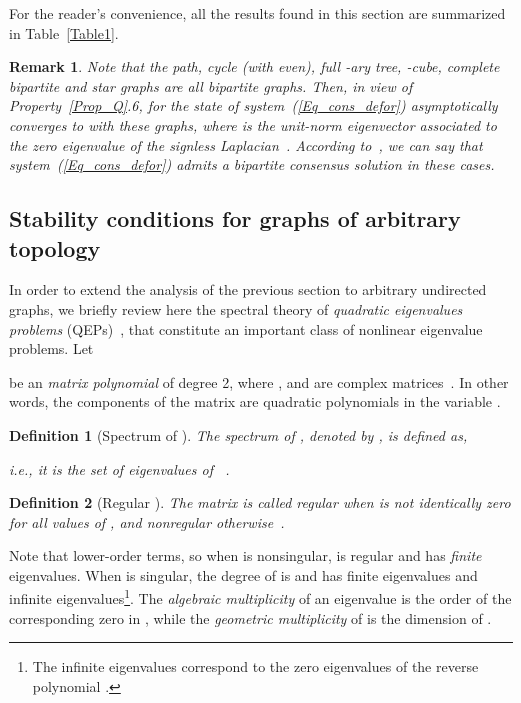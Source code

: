 \documentclass[letterpaper,9pt,twocolumn]{autart}
\newtheorem{definition}{\textbf{Definition}}
\newtheorem{remark}{\textbf{Remark}}
\begin{document}
For the reader's convenience, all the results found in this section are summarized in Table~\ref{Table1}.

\begin{remark}\label{Remark_bipart}
Note that the path, cycle (with  even), full -ary tree, -cube, complete
bipartite and star graphs are all \emph{bipartite} graphs. Then, in
view of Property~\ref{Prop_Q}.6, for  the state of system~(\ref{Eq_cons_defor})
asymptotically converges to  with these graphs, where 
is the unit-norm eigenvector associated to the zero eigenvalue of the signless
Laplacian~. According to~\cite[Def.~1]{Altafini_TAC13}, we can say that system~(\ref{Eq_cons_defor}) admits a \emph{bipartite
consensus solution} in these cases.~\hfill \end{remark}



\subsection{Stability conditions for graphs of arbitrary topology}\label{Sect:Gen}

In order to extend the analysis of the previous section to arbitrary undirected graphs, we briefly review here the spectral theory of \emph{quadratic eigenvalues problems}
(QEPs)~\cite[Sect.~3]{TisseurMe_SIAM01},
that constitute an important class of nonlinear eigenvalue problems. Let

be an  \emph{matrix polynomial} of degree 2,
where ,  and  are  complex matrices~\cite{GohbergLaRo_Book09}.
In other words, the components of the matrix  are
quadratic polynomials in the variable .


\begin{definition}[Spectrum of ]
The \emph{spectrum} of , denoted by , is defined as,

i.e., it is the set of eigenvalues of ~\cite{TisseurMe_SIAM01}.\hfill
\end{definition}

\begin{definition}[Regular ]\label{Def_regular}
The matrix  is called \emph{regular} when  is not identically zero
for all values of , and \emph{nonregular} otherwise~\cite{TisseurMe_SIAM01}.\hfill
\end{definition}

Note that 
lower-order terms, so when  is nonsingular,  is regular and has
 \emph{finite} eigenvalues. When  is singular, the degree of
 is  and  has  finite eigenvalues and
 infinite eigenvalues\footnote{The infinite eigenvalues correspond to the zero eigenvalues
of the reverse polynomial .}.
The \emph{algebraic multiplicity} of an eigenvalue  is the order of the corresponding
zero in , while the \emph{geometric multiplicity} of
 is the dimension of .
\end{document}
